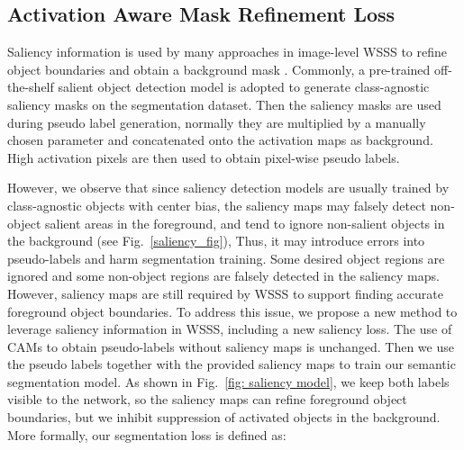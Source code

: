 \documentclass[10pt,twocolumn,letterpaper]{article}
\begin{document}
\subsection{Activation Aware Mask Refinement Loss}
Saliency information is used by many approaches in image-level WSSS to refine object boundaries and obtain a background mask
\cite{sun2020mining, jiang2019integral, lee2019ficklenet, fan2020cian, fan2018associating, hou2018self, huang2018weakly, wei2018revisiting, wang2018weakly}.
Commonly, a pre-trained off-the-shelf salient object detection model is adopted to generate class-agnostic saliency masks on the segmentation dataset. 
Then the saliency masks are used during pseudo label generation, normally they
are multiplied by a manually chosen parameter and concatenated onto the activation maps as background. High activation pixels are then used to obtain pixel-wise 
pseudo labels.




However, we observe that since saliency detection models are usually trained by class-agnostic objects with center bias,
the saliency maps may falsely detect non-object salient areas in the foreground, and tend to
ignore non-salient objects in the background (see Fig.~\ref{saliency_fig}),
Thus, it may introduce errors into pseudo-labels and harm segmentation training. 
Some desired object regions are ignored and some non-object regions are falsely detected in the saliency maps.
However, saliency maps are still required by WSSS to support finding accurate foreground object boundaries.
To address this issue, we propose a new method to leverage  saliency information in WSSS, including a new saliency loss.
The use of CAMs to obtain pseudo-labels without saliency maps is unchanged.
Then we use the
pseudo labels together with the provided saliency maps to 
train our semantic segmentation model.
As shown in Fig.~\ref{fig: saliency model},
we keep both labels visible to the network, 
so the saliency maps can refine foreground object boundaries, 
but we inhibit suppression of 
activated objects in the background.
More formally, our segmentation loss is defined as:


\vspace{-3mm}
\end{document}
